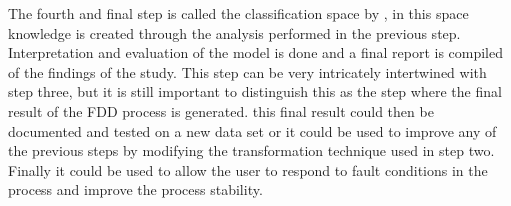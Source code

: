 The fourth and final step is called the classification space by \cite{venkatasubramanian2003review}, in this space knowledge is created through the analysis performed in the previous step. Interpretation and evaluation of the model is done and a final report is compiled of the findings of the study. This step can be very intricately intertwined with step three, but it is still important to distinguish this as the step where the final result of the FDD process is generated. this final result could then be documented and tested on a new data set or it could be used to improve any of the previous steps by modifying the transformation technique used in step two. Finally it could be used to allow the user to respond to fault conditions in the process and improve the process stability.




